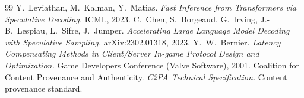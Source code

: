 \documentclass[11pt]{article}
\begin{document}
\begin{thebibliography}{99}
 Y.\ Leviathan, M.\ Kalman, Y.\ Matias. \emph{Fast Inference from Transformers via
Speculative Decoding.} ICML, 2023.
 C.\ Chen, S.\ Borgeaud, G.\ Irving, J.-B.\ Lespiau, L.\ Sifre, J.\ Jumper. \emph{Accelerating
Large Language Model Decoding with Speculative Sampling.} arXiv:2302.01318, 2023.
 Y.\ W.\ Bernier. \emph{Latency Compensating Methods in Client/Server In-game Protocol Design
and Optimization.} Game Developers Conference (Valve Software), 2001.
 Coalition for Content Provenance and Authenticity. \emph{C2PA Technical Specification.} Content
provenance standard.

\end{thebibliography}
\end{document}
